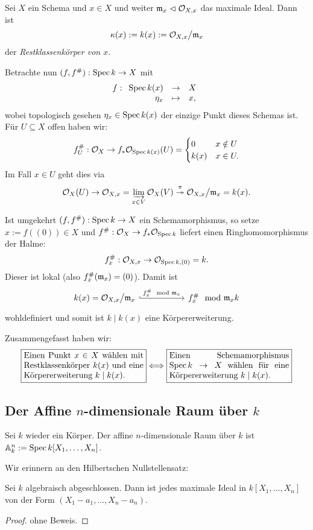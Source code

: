\begin{bemerkung}
	Sei $X$ ein Schema und $x\in X$ und weiter $\mathfrak{m}_x \vartriangleleft \mathcal{O}_{X,x}$ das
	maximale Ideal.
	Dann ist 
	\[
		\kappa(x) := k(x) := \mathcal{O}_{X,x} \big/ \mathfrak{m}_x
	\]
	der \emph{Restklassenkörper von $x$}.
	
	Betrachte nun $(f,f^{\#}): \operatorname{Spec} k \to X$ mit
	\[
		f: \funcdef{\Spec k(x) & \to & X \\
			\eta_x & \mapsto & x,}
	\]
	wobei topologisch gesehen $\eta_x \in \operatorname{Spec} k(x)$ der einzige Punkt 
	dieses Schemas ist.
	Für $U\subseteq X$ offen haben wir:
	\[
		f^{\#}_U : \mathcal{O}_X \to 
			f_\ast \mathcal{O}_{\operatorname{Spec} k(x)}(U) = 
			\begin{cases} 0 & x\notin U \\ k(x) & x \in U. \end{cases}
	\]
	Im Fall $x \in U$ geht dies via
	\[
		\mathcal{O}_X(U) \to \mathcal{O}_{X,x} = \varinjlim_{x\in V} \mathcal{O}_X(V)
			\overset\pi\twoheadrightarrow  \mathcal{O}_{X,x}\big/ \mathfrak{m}_x = k(x). 
	\]
	
	Ist umgekehrt $(f,f^{\#}):\operatorname{Spec} k \to X$ ein Schemamorphismus, so
	setze $x := f((0)) \in X$ und
	$f^{\#}: \mathcal{O}_X \to f_\ast \mathcal{O}_{\operatorname{Spec} k}$ liefert einen Ringhomomorphismus der
	Halme:
	\[
		f_x^{\#}: \mathcal{O}_{X,x} \to \mathcal{O}_{\operatorname{Spec} k, (0)} = k.
	\]
	Dieser ist lokal (also $f^{\#}_x (\mathfrak{m}_x) = (0)$). Damit ist
	\[
		\begin{tikzcd}
		k(x) = \O_{X,x} \big/ \m_x \rar[hookrightarrow]{f_x\fis \mod \m_x} 
		&[7ex]  {f_x\fis \mod \m_x} k
		\end{tikzcd}
	\]
	wohldefiniert und somit ist $k \mid k(x)$ eine Körpererweiterung.
	
	Zusammengefasst haben wir:
	\[	\fbox{\parbox{5cm}{
			Einen Punkt $x\in X$ wählen mit Restklassenkörper
			$k(x)$ und eine Körpererweiterung $k\mid k(x)$.}}
		\Longleftrightarrow
		\fbox{\parbox{5cm}{
			Einen Schemamorphismus $\Spec k \to X$ wählen
			für eine Körpererweiterung $k\mid k(x)$.}}
	\]
\end{bemerkung}

\subsection{Der Affine $n$-dimensionale Raum über $k$}
Sei $k$ wieder ein Körper. Der affine $n$-dimensionale Raum über $k$ ist
$\mathbb{A}_k^n := \operatorname{Spec} k[X_1,\ldots, X_n]$.

Wir erinnern an den Hilbertschen Nullstellensatz:
\begin{satz}
	\label{satz:hilbertscher nullstellensatz}
	Sei $k$ algebraisch abgeschlossen. Dann ist jedes maximale Ideal
	in $k[X_1,\ldots, X_n]$ von der Form
	$(X_1-a_1, \ldots, X_n - a_n)$.
\end{satz}
\begin{proof}
	ohne Beweis.
\end{proof}

